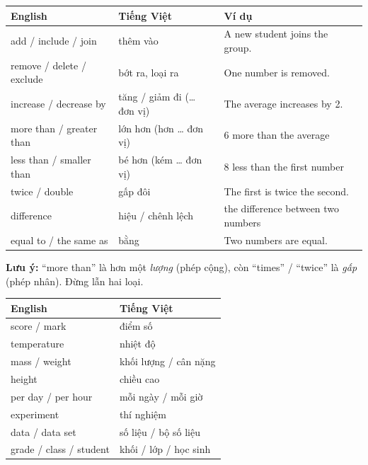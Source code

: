 \documentclass[../main.tex]{subfiles}
\begin{document}
\begin{center}
\begin{tabular}{|S{4.6cm}|S{4cm}|S{6.6cm}|}
    \hline
    \textbf{English} & \textbf{Tiếng Việt} & \textbf{Ví dụ} \\
    \hline
    add / include / join & thêm vào & A new student joins the group. \\
    \hline
    remove / delete / exclude & bớt ra, loại ra & One number is removed. \\
    \hline
    increase / decrease by & tăng / giảm đi (\dots{} đơn vị) & The average increases by 2. \\
    \hline
    more than / greater than & lớn hơn (hơn \dots{} đơn vị) & 6 more than the average \\
    \hline
    less than / smaller than & bé hơn (kém \dots{} đơn vị) & 8 less than the first number \\
    \hline
    twice / double & gấp đôi & The first is twice the second. \\
    \hline
    difference & hiệu / chênh lệch & the difference between two numbers \\
    \hline
    equal to / the same as & bằng & Two numbers are equal. \\
    \hline
\end{tabular}
\end{center}

\begin{luuy}
    \textbf{Lưu ý:} ``more than'' là hơn một \textit{lượng} (phép cộng), còn ``times'' / ``twice'' là \textit{gấp} (phép nhân). Đừng lẫn hai loại.
\end{luuy}

\begin{center}
\begin{tabular}{|S{5cm}|S{5cm}|}
    \hline
    \textbf{English} & \textbf{Tiếng Việt} \\
    \hline
    score / mark & điểm số \\
    \hline
    temperature & nhiệt độ \\
    \hline
    mass / weight & khối lượng / cân nặng \\
    \hline
    height & chiều cao \\
    \hline
    per day / per hour & mỗi ngày / mỗi giờ \\
    \hline
    experiment & thí nghiệm \\
    \hline
    data / data set & số liệu / bộ số liệu \\
    \hline
    grade / class / student & khối / lớp / học sinh \\
    \hline
\end{tabular}
\end{center}
\end{document}
